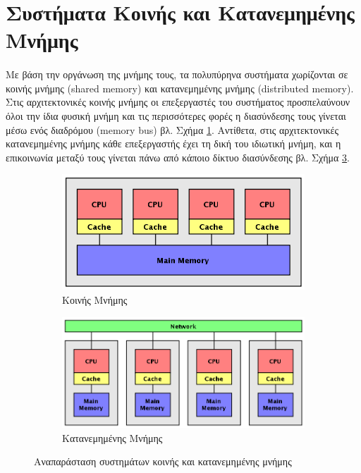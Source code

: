 \section{Συστήματα Κοινής και Κατανεμημένης Μνήμης}
\paragraph{}
Με βάση την οργάνωση της μνήμης τους, τα πολυπύρηνα συστήματα χωρίζονται σε κοινής μνήμης (shared memory) και κατανεμημένης μνήμης (distributed memory). Στις αρχιτεκτονικές κοινής μνήμης οι επεξεργαστές του συστήματος προσπελαύνουν όλοι την ίδια φυσική μνήμη και τις περισσότερες φορές η διασύνδεσης τους γίνεται μέσω ενός διαδρόμου (memory bus) βλ. Σχήμα \ref{fig:SMP}. Αντίθετα, στις αρχιτεκτονικές κατανεμημένης μνήμης κάθε επεξεργαστής έχει τη δική του ιδιωτική μνήμη, και η επικοινωνία μεταξύ τους γίνεται πάνω από κάποιο δίκτυο διασύνδεσης βλ. Σχήμα  \ref{fig:cluster}.

\begin{figure}
    \centering
    \begin{subfigure}[b]{0.45\textwidth}
        \includegraphics[width=\textwidth]{./images/SMP.png}
        \caption{Κοινής Μνήμης}
        \label{fig:SMP}
    \end{subfigure}
    \quad %
    \begin{subfigure}[b]{0.45\textwidth}
        \includegraphics[width=\textwidth]{./images/cluster.png}
        \caption{Κατανεμημένης Μνήμης}
        \label{fig:cluster}
    \end{subfigure}
    \caption{Αναπαράσταση συστημάτων κοινής και κατανεμημένης μνήμης}
\end{figure}
